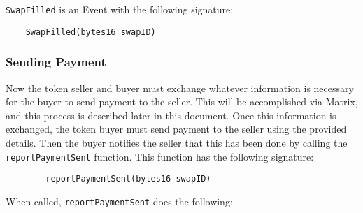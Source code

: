 \documentclass[11pt]{article}
\begin{document}
    \verb|SwapFilled| is an Event with the following signature:
    \begin{verbatim}
    SwapFilled(bytes16 swapID)
    \end{verbatim}

    \subsubsection*{Sending Payment}

    Now the token seller and buyer must exchange whatever information is necessary for the buyer to send payment to the seller.
    This will be accomplished via Matrix, and this process is described later in this document.
    Once this information is exchanged, the token buyer must send payment to the seller using the provided details.
    Then the buyer notifies the seller that this has been done by calling the \verb|reportPaymentSent| function.
    This function has the following signature:
    \begin{verbatim}
        reportPaymentSent(bytes16 swapID)
    \end{verbatim}

    When called, \verb|reportPaymentSent| does the following:
\end{document}
